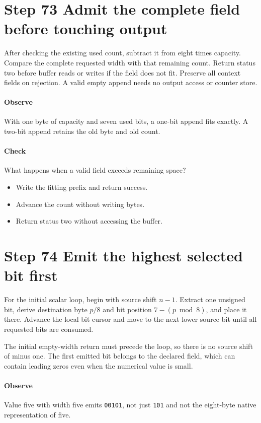 \section{Step 73 Admit the complete field before touching output}\label{h263-writer-s03}
After checking the existing used count, subtract it from eight times capacity.
Compare the complete requested width with that remaining count. Return status
two before buffer reads or writes if the field does not fit. Preserve all context
fields on rejection. A valid empty append needs no output access or counter store.

\paragraph{Observe} With one byte of capacity and seven used bits, a one-bit
append fits exactly. A two-bit append retains the old byte and old count.
\paragraph{Check} What happens when a valid field exceeds remaining space?
\begin{itemize}
  \item[A.] Write the fitting prefix and return success.
  \item[B.] Advance the count without writing bytes.
  \item[C.] Return status two without accessing the buffer.
\end{itemize}

\section{Step 74 Emit the highest selected bit first}\label{h263-writer-s04}
For the initial scalar loop, begin with source shift $n-1$. Extract one unsigned
bit, derive destination byte $p/8$ and bit position $7-(p\bmod8)$, and place it
there. Advance the local bit cursor and move to the next lower source bit until
all requested bits are consumed.

The initial empty-width return must precede the loop, so there is no source
shift of minus one. The first emitted bit belongs to the declared field, which
can contain leading zeros even when the numerical value is small.

\paragraph{Observe} Value five with width five emits \texttt{00101}, not just
\texttt{101} and not the eight-byte native representation of five.
